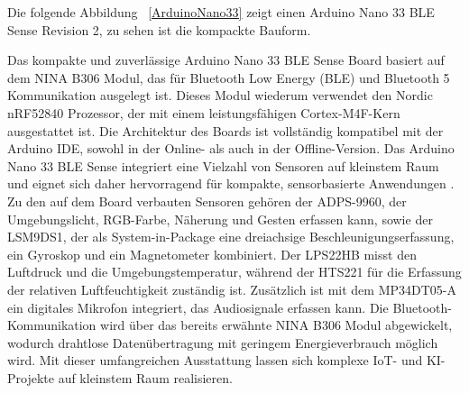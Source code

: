 Die folgende Abbildung ~\ref{ArduinoNano33} zeigt einen Arduino Nano 33 BLE Sense Revision 2, zu sehen ist die kompackte Bauform.

\begin{center}

   

    
%    
% 
 
    
    \label{ArduinoNano33}
\end{center}


Das kompakte und zuverlässige Arduino Nano 33 BLE Sense Board basiert auf dem NINA B306 Modul, das für Bluetooth Low Energy (BLE) und Bluetooth 5 Kommunikation ausgelegt ist. Dieses Modul wiederum verwendet den Nordic nRF52840 Prozessor, der mit einem leistungsfähigen Cortex-M4F-Kern ausgestattet ist. Die Architektur des Boards ist vollständig kompatibel mit der Arduino IDE, sowohl in der Online- als auch in der Offline-Version. Das Arduino Nano 33 BLE Sense integriert eine Vielzahl von Sensoren auf kleinstem Raum und eignet sich daher hervorragend für kompakte, sensorbasierte Anwendungen
\cite{Arduino:2021}.\\

Zu den auf dem Board verbauten Sensoren gehören der ADPS-9960, der Umgebungslicht, RGB-Farbe, Näherung und Gesten erfassen kann, sowie der LSM9DS1, der als System-in-Package eine dreiachsige Beschleunigungserfassung, ein Gyroskop und ein Magnetometer kombiniert. Der LPS22HB misst den Luftdruck und die Umgebungstemperatur, während der HTS221 für die Erfassung der relativen Luftfeuchtigkeit zuständig ist. Zusätzlich ist mit dem MP34DT05-A ein digitales Mikrofon integriert, das Audiosignale erfassen kann. Die Bluetooth-Kommunikation wird über das bereits erwähnte NINA B306 Modul abgewickelt, wodurch drahtlose Datenübertragung mit geringem Energieverbrauch möglich wird. Mit dieser umfangreichen Ausstattung lassen sich komplexe IoT- und KI-Projekte auf kleinstem Raum realisieren.\\




